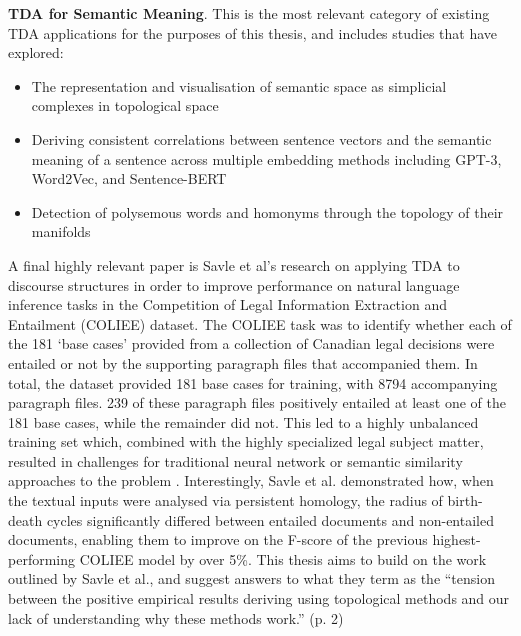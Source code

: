 \documentclass[12pt,twoside]{report}
\begin{document}
\textbf{TDA for Semantic Meaning}. This is the most relevant category of existing TDA applications for the purposes of this thesis, and includes studies that have explored:
\begin{itemize} [itemsep=0pt]
    \item The representation and visualisation of semantic space as simplicial complexes in topological space \cite{CHIANG2007256, karlgren2014}
    \item Deriving consistent correlations between sentence vectors and the semantic meaning of a sentence across multiple embedding methods including GPT-3, Word2Vec, and Sentence-BERT \cite{sun2023topologicalinterpretationsgpt3}
    \item Detection of polysemous words \cite{jakubowski-etal-2020-topology} and homonyms \cite{temčinas2018localhomologywordembeddings} through the topology of their manifolds 
\end{itemize} 

A final highly relevant paper is Savle et al's \cite{savle-etal-2019-topological} research on applying TDA to discourse structures in order to improve performance on natural language inference tasks in the Competition of Legal Information Extraction and Entailment (COLIEE) dataset. The COLIEE task was to identify whether each of the 181 `base cases' provided from a collection of Canadian legal decisions were entailed or not by the supporting paragraph files that accompanied them. In total, the dataset provided 181 base cases for training, with 8794 accompanying paragraph files. 239 of these paragraph files positively entailed at least one of the 181 base cases, while the remainder did not. This led to a highly unbalanced training set which, combined with the highly specialized legal subject matter, resulted in challenges for traditional neural network or semantic similarity approaches to the problem \cite{savle-etal-2019-topological}. Interestingly, Savle et al. demonstrated how, when the textual inputs were analysed via persistent homology, the radius of birth-death cycles significantly differed between entailed documents and non-entailed documents, \cite{savle-etal-2019-topological} enabling them to improve on the F-score of the previous highest-performing COLIEE model by over 5\%. This thesis aims to build on the work outlined by Savle et al., and suggest answers to what they term as the ``tension between the positive empirical results deriving using topological methods and our lack of understanding why these methods work.'' (p. 2)\cite{savle-etal-2019-topological}
\end{document}
